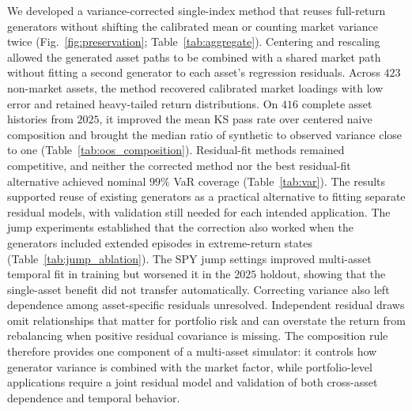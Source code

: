 We developed a variance-corrected single-index method that reuses
full-return generators without shifting the calibrated mean or
counting market variance twice (Fig.~\ref{fig:preservation};
Table~\ref{tab:aggregate}). Centering and rescaling allowed the
generated asset paths to be combined with a shared market path without
fitting a second generator to each asset's regression residuals.
Across $423$ non-market assets, the method recovered calibrated
market loadings with low error and retained heavy-tailed return
distributions. On $416$ complete asset histories from $2025$, it
improved the mean KS pass rate over centered naive composition and
brought the median ratio of synthetic to observed variance close to
one (Table~\ref{tab:oos_composition}). Residual-fit methods remained competitive, and neither the
corrected method nor the best residual-fit alternative achieved
nominal $99\%$ VaR coverage (Table~\ref{tab:var}). The results supported reuse of existing
generators as a practical alternative to fitting separate residual
models, with validation still needed for each intended application.
The jump experiments established that the correction also worked when
the generators included extended episodes in extreme-return states
(Table~\ref{tab:jump_ablation}).
The SPY jump settings improved multi-asset temporal fit in training
but worsened it in the $2025$ holdout, showing that the single-asset
benefit did not transfer automatically. Correcting variance also left
dependence among asset-specific residuals unresolved. Independent
residual draws omit relationships that matter for portfolio risk and
can overstate the return from rebalancing when positive residual
covariance is missing. The composition rule therefore provides one
component of a multi-asset simulator: it controls how generator
variance is combined with the market factor, while portfolio-level
applications require a joint residual model and validation of both
cross-asset dependence and temporal behavior.

